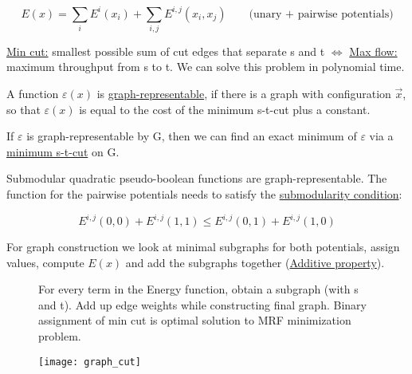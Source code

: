 \[E(x) = \sum_i E^i(x_i) + \sum_{i,j} E^{i,j} (x_i, x_j) \qquad \text{(unary + pairwise potentials)}\]

\underline{Min cut:} smallest possible sum of cut edges that separate s and t $\Leftrightarrow$ \underline{Max flow:} maximum throughput from s to t. We can solve this problem in polynomial time.

A function $\varepsilon(x)$ is \underline{graph-representable}, if there is a graph with configuration $\vec{x}$, so that $\varepsilon(x)$ is equal to the cost of the minimum s-t-cut plus a constant.

If $\varepsilon$ is  graph-representable by G, then we can find an exact minimum of $\varepsilon$ via a \underline{minimum s-t-cut} on G.

Submodular quadratic pseudo-boolean functions are graph-representable. The function for the pairwise potentials needs to satisfy the \underline{submodularity condition}:

\[E^{i,j}(0,0) + E^{i,j}(1,1) \leq E^{i,j}(0,1) + E^{i,j}(1,0)\]

For graph construction we look at minimal subgraphs for both potentials, assign values, compute $E(x)$ and add the subgraphs together (\underline{Additive property}).

\begin{figure}[H]
	\centering
	\begin{minipage}[b]{0.5\textwidth}
		For every term in the Energy function, obtain a subgraph (with s and t). Add up edge weights while constructing final graph. Binary assignment of min cut is optimal solution to MRF minimization problem.
	\end{minipage}
	\begin{minipage}[b]{0.4\textwidth}
		\texttt{[image: graph\_cut]}
	\end{minipage}
\end{figure}



%
%
%
%
%
%
%
%
%
%
%

